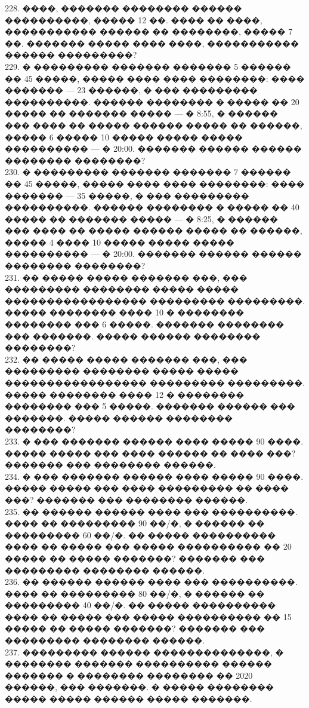 \documentclass[12pt]{article}
\begin{document}
228. ����, ������� �������� ������ ����������, ����� 12 ��. ���� �� ����, ����������� ������ �� ��������, ����� 7 ��. ������� ����� ���� ����, ����������� ������ ���������?\\
229. � ��������� ������� ������� 5 ������ �� 45 �����, ����� ���� ���� ��������: ���� ������� --- 23 ������, � ��� ��������� ����������. ������ �������� � ����� �� 20 ����� �� ������� ����� --- � 8:55, � ������ ��� ���� �� ����� ������ ����� �� ������, ����� 6 ����� 10 ����� ����� ����� ���������� --- � 20:00. ������� ������ ������ �������� ��������?\\
230. � ��������� ������� ������� 7 ������ �� 45 �����, ����� ���� ���� ��������: ���� ������� --- 35 �����, � ��� ��������� ����������. ������ �������� � ����� �� 40 ����� �� ������� ����� --- � 8:25, � ������ ��� ���� �� ����� ������ ����� �� ������, ����� 4 ���� 10 ����� ����� ����� ���������� --- � 20:00. ������� ������ ������ �������� ��������?\\
231. �� ����� ����� ������� ���, ��� ��������� �������� ����� ����� ����������������� ��������� ���������. ����� �������� ���� 10 � �������� �������� ��� 6 �����. ������� �������� ��� �������. ����� ������ �������� ��������?\\
232. �� ����� ����� ������� ���, ��� ��������� �������� ����� ����� ����������������� ��������� ���������. ����� �������� ���� 12 � �������� �������� ��� 5 �����. ������� ������ ��� �������. ����� ������ �������� ��������?\\
233. � ��� ������� ������ ���� ����� 90 ����. ����� ����� ��� ���� ������ �� ���� ���? ������� ��� �������� ������.\\
234. � ��� ������� ������ ���� ����� 90 ����. ����� ����� ��� ���� ��������� �� ���� ���? ������� ��� �������� ������.\\
235. �� ������ ������ ���� ��� ����������. ���� �� ��������� 90 ��/�, � ������ �� ��������� 60 ��/�. �� ����� ���������� ���� �� ����� ��� ����� ���������� �� 20 ����� �� ����� �������? ������� ��� ��������� �������� ������.\\
236. �� ������ ������ ���� ��� ����������. ���� �� ��������� 80 ��/�, � ������ �� ��������� 40 ��/�. �� ����� ���������� ���� �� ����� ��� ����� ���������� �� 15 ����� �� ����� �������? ������� ��� ��������� �������� ������.\\
237. ��������� ������ ��������������, � �������� ������� ���������� ������ ������� � �������� �������� �� 2020 ������, ��� �������. � ����� �������� ����� ����� ������ ����� �������.\\
\end{document}
